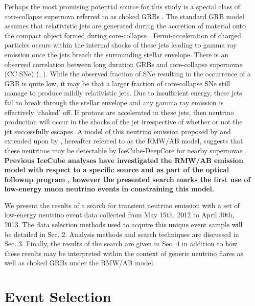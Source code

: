 \documentclass[manuscript]{aastex}
\begin{document}
Perhaps the most promising potential source for this study is a special class of core-collapse supernova referred to as choked GRBs \citep{2001PhRvL..87q1102M}. The standard GRB model assumes that relativistic jets are generated during the accretion of material onto the compact object formed during core-collapse \citep{1992MNRAS.258P..41R}. Fermi-acceleration of charged particles occurs within the internal shocks of these jets leading to gamma ray emission once the jets breach the surrounding stellar envelope. There is an observed correlation between long duration GRBs and core-collapse supernovae (CC SNe) (\citep{2006ARA&A..44..507W}, \citep{2011AN....332..434M}). While the observed fraction of SNe resulting in the occurrence of a GRB is quite low, it may be that a larger fraction of core-collapse SNe still manage to produce mildly relativistic jets.  Due to insufficient energy, these jets fail to break through the stellar envelope and any gamma ray emission is effectively `choked' off. If protons are accelerated in these jets, then neutrino production will occur in the shocks of the jet irrespective of whether or not the jet successfully escapes. A model of this neutrino emission proposed by \cite{2004PhRvL..93r1101R} and extended upon by \cite{2005PhRvL..95f1103A}, hereafter referred to as the RMW/AB model, suggests that these neutrinos may be detectable by IceCube-DeepCore for nearby supernovae \citep{PhysRevD.81.083011}. \textbf{Previous IceCube analyses have investigated the RMW/AB emission model with respect to a specific source \citep{2011A&A...527A..28I} and as part of the optical followup program \citep{2012A&A...539A..60A}, however the presented search marks the first use of low-energy muon neutrino events in constraining this model.}

We present the results of a search for transient neutrino emission with a set of low-energy neutrino event data collected from May 15th, 2012 to April 30th, 2013. The data selection methods used to acquire this unique event sample will be detailed in Sec. 2. Analysis methods and search techniques are discussed in Sec. 3. Finally, the results of the search are given in Sec. 4 in addition to how these results may be interpreted within the context of generic neutrino flares as well as choked GRBs under the RMW/AB model.
\section{Event Selection}
\end{document}
